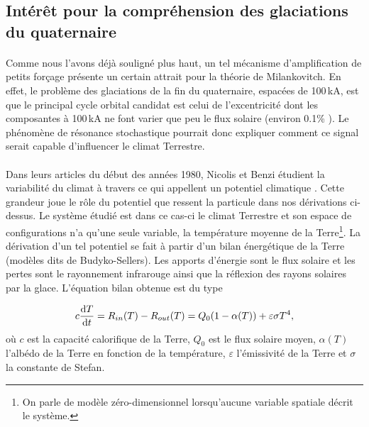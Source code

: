 \subsection{Intérêt pour la compréhension des glaciations du quaternaire}

\paragraph{} Comme nous l'avons déjà souligné plus haut, un tel mécanisme d'amplification de petits forçage présente un certain attrait pour la théorie de Milankovitch. En effet, le problème des glaciations de la fin du quaternaire, espacées de 100\,kA, est que le principal cycle orbital candidat est celui de l'excentricité dont les composantes à 100\,kA ne font varier que peu le flux solaire (environ 0.1\% \cite{scholarpedia}). Le phénomène de résonance stochastique pourrait donc expliquer comment ce signal serait capable d'influencer le climat Terrestre. 

\paragraph{} Dans leurs articles du début des années 1980, Nicolis et Benzi étudient la variabilité du climat à travers ce qui appellent un potentiel climatique \cite{nicolis1982} \cite{benzi1983}. Cette grandeur joue le rôle du potentiel que ressent la particule dans nos dérivations ci-dessus. Le système étudié est dans ce cas-ci le climat Terrestre et son espace de configurations n'a qu'une seule variable, la température moyenne de la Terre\footnote{On parle de modèle zéro-dimensionnel lorsqu'aucune variable spatiale décrit le système.}. La dérivation d'un tel potentiel se fait à partir d'un bilan énergétique de la Terre (modèles dits de Budyko-Sellers). Les apports d'énergie sont le flux solaire et les pertes sont le rayonnement infrarouge ainsi que la réflexion des rayons solaires par la glace. L'équation bilan obtenue est du type

\begin{equation}\label{bilan_thermique}
	c\dv{T}{t} = R_{in}(T) - R_{out}(T) = Q_0(1-\alpha(T)) + \varepsilon \sigma T^4,
\end{equation}
où $c$ est la capacité calorifique de la Terre, $Q_0$ est le flux solaire moyen, $\alpha(T)$ l'albédo de la Terre en fonction de la température, $\varepsilon$ l'émissivité de la Terre et $\sigma$ la constante de Stefan.
         
